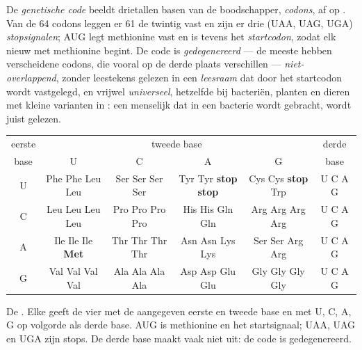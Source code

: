 \begin{definition}\label{def:b1:gene-expression:code}
De \emph{genetische code} beeldt drietallen basen van de boodschapper,
\emph{codons}, af op . Van de 64 codons leggen er 61 de twintig
 vast en zijn er drie (UAA, UAG, UGA) \emph{stopsignalen}; AUG legt
methionine vast en is tevens het \emph{startcodon}, zodat elk nieuw  met
methionine begint. De code is \emph{gedegenereerd} --- de meeste  hebben
verscheidene codons, die vooral op de derde plaats verschillen ---
\emph{niet-overlappend}, zonder leestekens gelezen in een \emph{leesraam} dat door
het startcodon wordt vastgelegd, en vrijwel \emph{universeel}, hetzelfde bij
bacteriën, planten en dieren met kleine varianten in : een menselijk
 dat in een bacterie wordt gebracht, wordt juist gelezen.
\end{definition}

\begin{omfigure}
\begin{center}
\footnotesize
\begin{tabular}{c|cccc|c}
\hline
eerste & \multicolumn{4}{c|}{tweede base} & derde \\
base & U & C & A & G & base \\
\hline
U & Phe Phe Leu Leu & Ser Ser Ser Ser & Tyr Tyr \textbf{stop} \textbf{stop} & Cys Cys \textbf{stop} Trp & U C A G \\
C & Leu Leu Leu Leu & Pro Pro Pro Pro & His His Gln Gln & Arg Arg Arg Arg & U C A G \\
A & Ile Ile Ile \textbf{Met} & Thr Thr Thr Thr & Asn Asn Lys Lys & Ser Ser Arg Arg & U C A G \\
G & Val Val Val Val & Ala Ala Ala Ala & Asp Asp Glu Glu & Gly Gly Gly Gly & U C A G \\
\hline
\end{tabular}
\end{center}

{\small De . Elke  geeft de vier  met de aangegeven eerste
en tweede base en met U, C, A, G op volgorde als derde base. AUG is methionine en
het startsignaal; UAA, UAG en UGA zijn stops. De derde base maakt vaak niet uit: de
code is gedegenereerd.}
\end{omfigure}

